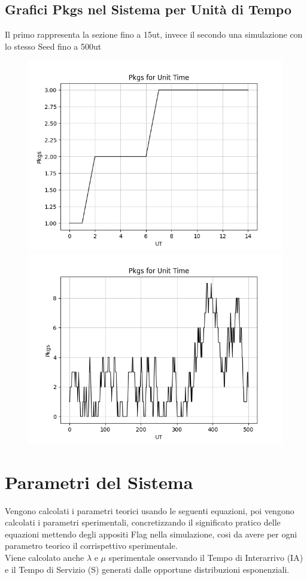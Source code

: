 \documentclass[12pt,a4paper]{article}
\begin{document}
\subsection{Grafici Pkgs nel Sistema per Unità di Tempo}
Il primo rappresenta la sezione fino a 15ut, invece il secondo una simulazione con lo stesso Seed fino a 500ut

\begin{figure}[h]
\centering
\includegraphics[scale=0.6]{PkgsUT}
\includegraphics[scale=0.6]{PkgsUT_Long}
\end{figure}

\newpage
\section{Parametri del Sistema}
Vengono calcolati i parametri teorici usando le seguenti equazioni, poi vengono calcolati i parametri sperimentali, concretizzando il significato pratico delle equazioni mettendo degli appositi Flag nella simulazione, cosi da avere per ogni parametro teorico il corrispettivo sperimentale. \\
Viene calcolato anche $\lambda$ e $\mu$ sperimentale osservando il Tempo di Interarrivo (IA) e il Tempo di Servizio (S) generati dalle opportune distribuzioni esponenziali. 
\end{document}
